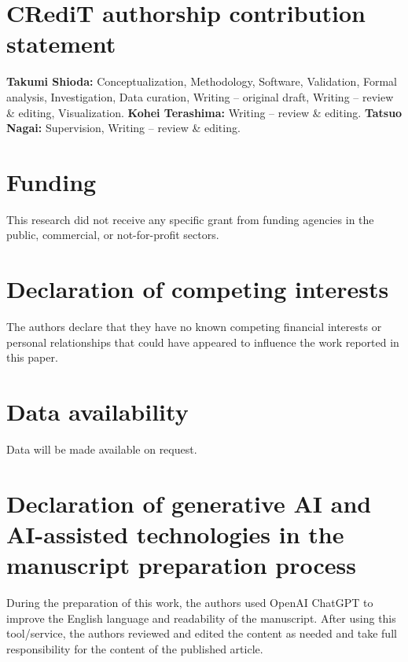 \documentclass[11pt]{article}
\begin{document}
\section*{CRediT authorship contribution statement}
\textbf{Takumi Shioda:} Conceptualization, Methodology, Software, Validation, Formal analysis, Investigation, Data curation, Writing -- original draft, Writing -- review \& editing, Visualization. \textbf{Kohei Terashima:} Writing -- review \& editing. \textbf{Tatsuo Nagai:} Supervision, Writing -- review \& editing.

\section*{Funding}
This research did not receive any specific grant from funding agencies in the public, commercial, or not-for-profit sectors.

\section*{Declaration of competing interests}
The authors declare that they have no known competing financial interests or personal relationships that could have appeared to influence the work reported in this paper.

\section*{Data availability}
Data will be made available on request.

\section*{Declaration of generative AI and AI-assisted technologies in the manuscript preparation process}
During the preparation of this work, the authors used OpenAI ChatGPT to improve the English language and readability of the manuscript. After using this tool/service, the authors reviewed and edited the content as needed and take full responsibility for the content of the published article.


\thispagestyle{fancy}

\clearpage
\appendix
\raggedbottom
{}
\end{document}
